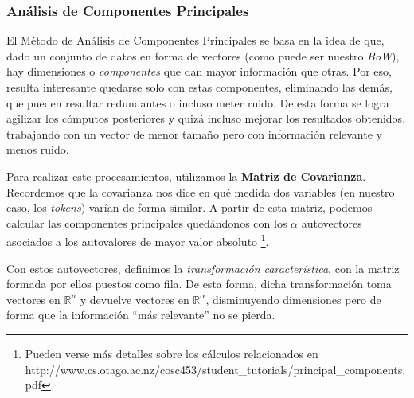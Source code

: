 
\subsubsection{Análisis de Componentes Principales}
\label{sec:pca}
El Método de Análisis de Componentes Principales se basa en la idea de que,
dado un conjunto de datos en forma de vectores (como puede ser nuestro \textit{BoW}),
hay dimensiones o \textit{componentes} que dan mayor información que otras.
Por eso, resulta interesante quedarse solo con estas componentes,
eliminando las demás, que pueden resultar redundantes o incluso meter ruido.
De esta forma se logra agilizar los cómputos posteriores y quizá incluso mejorar los resultados obtenidos,
trabajando con un vector de menor tamaño pero con información relevante y menos ruido.

Para realizar este procesamientos, utilizamos la \textbf{Matriz de Covarianza}.
Recordemos que la covarianza nos dice en qué medida dos variables
(en nuestro caso, los \textit{tokens}) varían de forma similar.
A partir de esta matriz, podemos calcular las componentes principales
quedándonos con los $\alpha$ autovectores asociados a los autovalores
de mayor valor absoluto
\footnote{Pueden verse más detalles sobre los cálculos relacionados en
http://www.cs.otago.ac.nz/cosc453/student\_tutorials/principal\_components.pdf}.

Con estos autovectores, definimos la \textit{transformación característica},
con la matriz formada por ellos puestos como fila.
De esta forma, dicha transformación toma vectores en $\mathbb{R}^{n}$ y devuelve
vectores en $\mathbb{R}^{\alpha}$, disminuyendo dimensiones pero de forma que
la información ``más relevante'' no se pierda.

